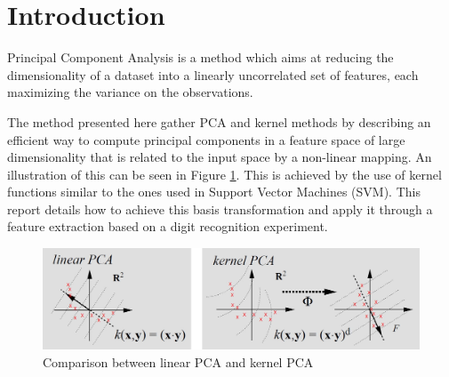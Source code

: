 \section*{Introduction} %
Principal Component Analysis is a method which aims at reducing the dimensionality of a dataset into a linearly uncorrelated set of features, each maximizing the variance on the observations.

The method presented here gather PCA and kernel methods by describing an efficient way to compute principal components in a feature space of large dimensionality that is related to the input space by a non-linear mapping. An illustration of this can be seen in Figure \ref{fig:kernel_pca}. This is achieved by the use of kernel functions similar to the ones used in Support Vector Machines (SVM). This report details how to achieve this basis transformation and apply it through a feature extraction based on a digit recognition experiment.

\begin{figure}[h!]
    \centering
    \includegraphics{img/kernel_pca.jpg}
    \caption{Comparison between linear PCA and kernel PCA}
    \label{fig:kernel_pca}
\end{figure}
